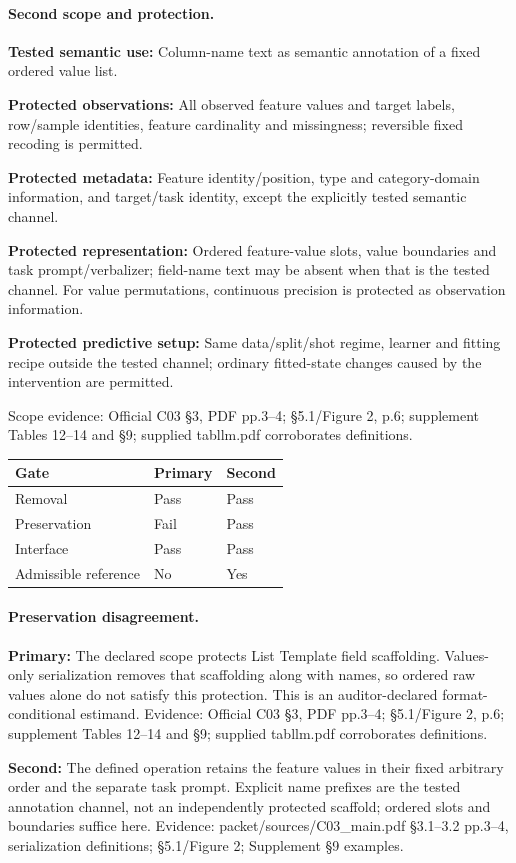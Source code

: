 \documentclass[10pt]{article}
\begin{document}
\paragraph{Second scope and protection.}
\textbf{Tested semantic use:} Column-name text as semantic annotation of a fixed ordered value list.\par
\textbf{Protected observations:} All observed feature values and target labels, row/sample identities, feature cardinality and missingness; reversible fixed recoding is permitted.\par
\textbf{Protected metadata:} Feature identity/position, type and category-domain information, and target/task identity, except the explicitly tested semantic channel.\par
\textbf{Protected representation:} Ordered feature-value slots, value boundaries and task prompt/verbalizer; field-name text may be absent when that is the tested channel. For value permutations, continuous precision is protected as observation information.\par
\textbf{Protected predictive setup:} Same data/split/shot regime, learner and fitting recipe outside the tested channel; ordinary fitted-state changes caused by the intervention are permitted.\par
Scope evidence: Official C03 §3, PDF pp.3--4; §5.1/Figure 2, p.6; supplement Tables 12--14 and §9; supplied tabllm.pdf corroborates definitions.\par
\begin{tabular}{lll}\toprule Gate & Primary & Second \\ \midrule
Removal & Pass & Pass \\
Preservation & Fail & Pass \\
Interface & Pass & Pass \\
Admissible reference & No & Yes \\
\bottomrule\end{tabular}
\paragraph{Preservation disagreement.}
\textbf{Primary:} The declared scope protects List Template field scaffolding. Values-only serialization removes that scaffolding along with names, so ordered raw values alone do not satisfy this protection. This is an auditor-declared format-conditional estimand. Evidence: Official C03 §3, PDF pp.3--4; §5.1/Figure 2, p.6; supplement Tables 12--14 and §9; supplied tabllm.pdf corroborates definitions.\par
\textbf{Second:} The defined operation retains the feature values in their fixed arbitrary order and the separate task prompt. Explicit name prefixes are the tested annotation channel, not an independently protected scaffold; ordered slots and boundaries suffice here. Evidence: packet/sources/C03\_main.pdf §3.1--3.2 pp.3--4, serialization definitions; §5.1/Figure 2; Supplement §9 examples.\par
\end{document}
